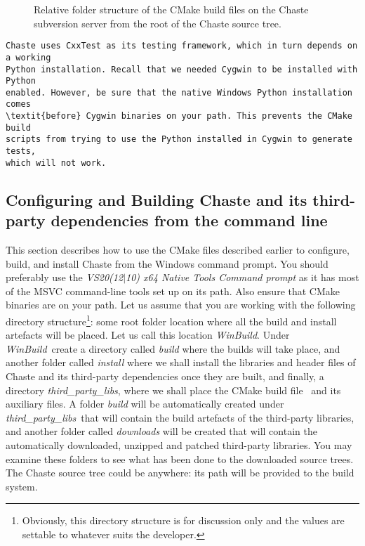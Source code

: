 \documentclass[10pt,a4paper]{article}
\begin{document}
\begin{figure}[!h]
\caption{Relative folder structure of the CMake build files on the Chaste
subversion server from the root of the Chaste source
tree.}\label{fig:chaste:subtree}
\end{figure}


\begin{parchment}[Note]
\begin{lstlisting}
Chaste uses CxxTest as its testing framework, which in turn depends on a working
Python installation. Recall that we needed Cygwin to be installed with Python
enabled. However, be sure that the native Windows Python installation comes
\textit{before} Cygwin binaries on your path. This prevents the CMake build
scripts from trying to use the Python installed in Cygwin to generate tests,
which will not work.
\end{lstlisting}
\end{parchment}

\newcommand{\winbuild}{\textit{WinBuild}}
\newcommand{\thirdp}{\textit{third\_party\_libs}}
\subsection{Configuring and Building Chaste and its third-party dependencies
from the command line}
This section describes how to use the CMake files described earlier to
configure, build, and install Chaste from the Windows command prompt. You should
preferably use the \textit{VS20(12$|$10) x64 Native Tools Command prompt} as it
has most of the MSVC command-line tools set up on its path. Also ensure that
CMake binaries are on your path. Let us assume that you are working with the
following directory structure\footnote{Obviously, this directory structure is
for discussion only and the values are settable to whatever suits the
developer.}: some root folder location where all the build and install artefacts
will be placed. Let us call this location \winbuild. Under \winbuild\ create a
directory called \textit{build} where the builds will take place, and another
folder called \textit{install} where we shall install the libraries and header
files of Chaste and its third-party dependencies once they are built, and
finally, a directory \thirdp, where we shall place the CMake build file
\chastelibbuilder\ and its auxiliary files. A folder \textit{build} will be
automatically created under \thirdp\ that will contain the build artefacts of
the third-party libraries, and another folder called \textit{downloads} will be
created that will contain the automatically downloaded, unzipped and patched
third-party libraries. You may examine these folders to see what has been done
to the downloaded source trees. The Chaste source tree could be anywhere: its
path will be provided to the build system. 
\end{document}

